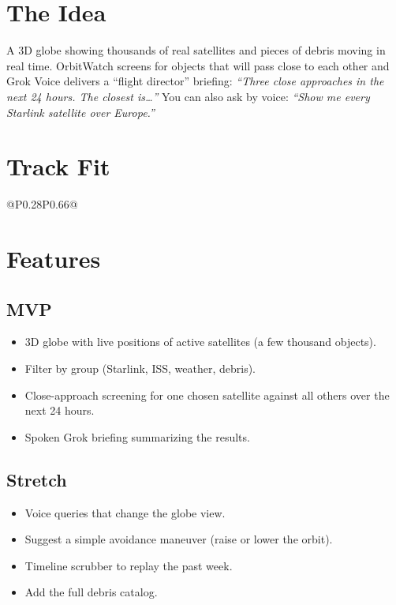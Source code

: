 \documentclass[11pt]{article}
\begin{document}

\section{The Idea}
A 3D globe showing thousands of real satellites and pieces of debris moving in
real time. OrbitWatch screens for objects that will pass close to each other and
Grok Voice delivers a ``flight director'' briefing:
\emph{``Three close approaches in the next 24 hours. The closest is\ldots''}
You can also ask by voice: \emph{``Show me every Starlink satellite over Europe.''}

\section{Track Fit}
\begin{tabular}{@{}P{0.28\textwidth}P{0.66\textwidth}@{}}
\toprule
{}
\bottomrule
\end{tabular}

\section{Features}
\subsection{MVP}
\begin{itemize}
  \item 3D globe with live positions of active satellites (a few thousand objects).
  \item Filter by group (Starlink, ISS, weather, debris).
  \item Close-approach screening for one chosen satellite against all others over the next 24 hours.
  \item Spoken Grok briefing summarizing the results.
\end{itemize}
\subsection{Stretch}
\begin{itemize}
  \item Voice queries that change the globe view.
  \item Suggest a simple avoidance maneuver (raise or lower the orbit).
  \item Timeline scrubber to replay the past week.
  \item Add the full debris catalog.
\end{itemize}
\end{document}
